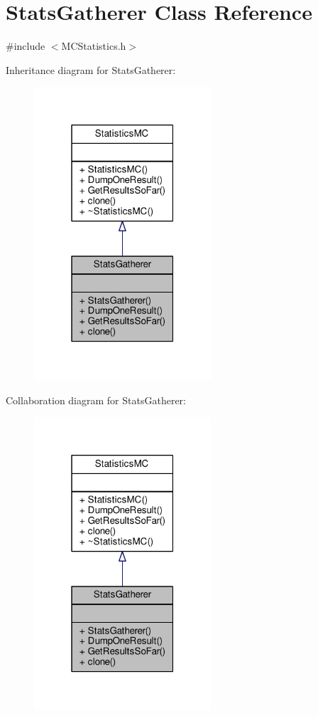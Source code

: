 \hypertarget{classStatsGatherer}{}\section{Stats\+Gatherer Class Reference}
\label{classStatsGatherer}


{\ttfamily \#include $<$M\+C\+Statistics.\+h$>$}



Inheritance diagram for Stats\+Gatherer\+:
\nopagebreak
\begin{figure}[H]
\begin{center}
\leavevmode
\includegraphics[width=187pt]{classStatsGatherer__inherit__graph}
\end{center}
\end{figure}


Collaboration diagram for Stats\+Gatherer\+:
\nopagebreak
\begin{figure}[H]
\begin{center}
\leavevmode
\includegraphics[width=187pt]{classStatsGatherer__coll__graph}
\end{center}
\end{figure}

